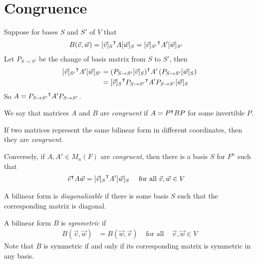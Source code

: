 \section{Congruence}
Suppose for bases $S$ and $S'$ of $V$ that
  \begin{align}
    B(\vec v, \vec w) &= {[\vec v]_S}^{\intercal} A [\vec w]_S = {[\vec v]_{S'}}^{\intercal} A' [\vec w]_{S'}
  \end{align}
Let $P_{S\to S'}$ be the change of basis matrix from $S$ to $S'$, then
  \begin{align}
    {[\vec v]_{S'}}^{\intercal} A' [\vec w]_{S'}
      &= {\left(P_{S\to S'}[\vec v]_S\right)}^{\intercal} A' \left(P_{S\to S'}[\vec w]_S\right) \\
      &= {[\vec v]_S}^{\intercal} {P_{S\to S'}}^{\intercal} A' P_{S\to S'}[\vec w]_S
  \end{align}
So $A = {P_{S\to S'}}^{\intercal} A' P_{S\to S'}$.

\begin{definition}
  We say that matrices $A$ and $B$ are \emph{congruent} if $A = {P}^{\intercal} B P$ for some invertible $P$.
\end{definition}

\begin{remark}
  If two matrices represent the same bilinear form in different coordinates, then they are \emph{congruent}.
  
  Conversely, if $A, A' \in M_n(F)$ are \emph{congruent}, then there is a basis $S$ for $F^n$ such that
  \begin{align}
    {\vec v}^{\intercal}A\vec w &= {[\vec v]_S}^{\intercal} A' [\vec w]_S & \text{ for all } &\vec v, \vec w \in V
  \end{align}
\end{remark}

\begin{definition}
  A bilinear form is \emph{diagonalizable} if there is some basis $S$ such that the corresponding matrix is diagonal.
\end{definition}

\begin{definition}
  A bilinear form $B$ is \emph{symmetric} if
  \begin{align}
    B(\vec v, \vec w) &= B(\vec w, \vec v) & \text{ for all } &\vec v, \vec w \in V
  \end{align}
  Note that $B$ is symmetric if and only if its corresponding matrix is symmetric in any basis.
\end{definition}

